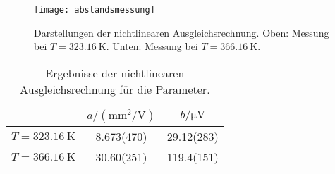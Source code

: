 \begin{figure}
  \centering
  \texttt{[image: abstandsmessung]}
  \caption{Darstellungen der nichtlinearen Ausgleichsrechnung. Oben:
    Messung bei $T = \SI{323.16}{\kelvin}$. Unten: Messung bei $T =
    \SI{366.16}{\kelvin}$.}
  \label{fig:abstand}
\end{figure}

\begin{table}
  \centering
  \begin{tabular}{lSS[table-figures-decimal = 2]}
    \toprule
    & {$a/(\si{\milli\metre\squared\per\volt})$} &
    {$b/\si{\micro\volt}$} \\
    \midrule
    $T = \SI{323.16}{\kelvin}$ & 8.673(470) & 29.12(283)\\
    $T = \SI{366.16}{\kelvin}$ & 30.60(251) & 119.4(151)\\
    \bottomrule
  \end{tabular}
  \caption{Ergebnisse der nichtlinearen Ausgleichsrechnung für die Parameter.}
  \label{tab:param}
\end{table}

